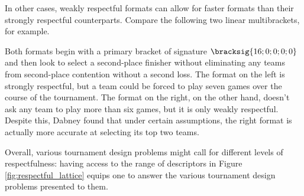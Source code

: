 {    In other cases, weakly respectful formats can allow for faster formats than their strongly respectful counterparts. Compare the following two linear multibrackets, for example.


    Both formats begin with a primary bracket of signature $\bracksig{16;0;0;0;0}$ and then look to select a second-place finisher without eliminating any teams from second-place contention without a second loss. The format on the left is strongly respectful, but a team could be forced to play seven games over the course of the tournament. The format on the right, on the other hand, doesn't ask any team to play more than six games, but it is only weakly respectful. Despite this, Dabney \cite{shifted} found that under certain assumptions, the right format is actually more accurate at selecting its top two teams.

    Overall, various tournament design problems might call for different levels of respectfulness: having access to the range of descriptors in Figure \ref{fig:respectful_lattice} equips one to answer the various tournament design problems presented to them.


    




}